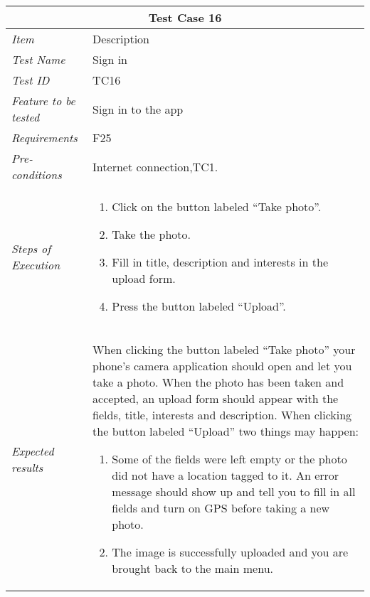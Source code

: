 \begin{minipage}{\linewidth}
\setlength{\tabcolsep}{15pt}
\centering
{}
\begin{tabular}{ |l|p{70mm}| }
	\hline
	\multicolumn{2}{|c|}{\cellcolor{gray!25} \textbf{Test Case 16}} \\
	\hline
	\it{\cellcolor{gray!25}Item} & {\cellcolor{gray!25} Description } \\
	\hline
	\it{\cellcolor{gray!25}Test Name } & Sign in \\ \hline
	\it{\cellcolor{gray!25}Test ID} & TC16 \\ \hline
	\it{\cellcolor{gray!25}Feature to be tested} & Sign in to the app \\ \hline
	\it{\cellcolor{gray!25}Requirements} & F25  \\ \hline
	\it{\cellcolor{gray!25}Pre-conditions} & Internet connection,TC1. \\ \hline
	\it{\cellcolor{gray!25}Steps of Execution} & \begin{enumerate}
	                                       \item Click on the button labeled “Take photo”.
	                                       \item Take the photo.
	                                       \item Fill in title, description and interests in the upload form.
	                                       \item Press the button labeled “Upload”.
	                                     \end{enumerate} \\ \hline
	\it{\cellcolor{gray!25}Expected results} & When clicking the button labeled “Take photo” your phone’s camera application should open and let you take a photo. When the photo has been taken and accepted, an upload form should appear with the fields, title, interests and description. When clicking the button labeled “Upload” two things may happen: \begin{enumerate}[label=\alph*)]
	                                       \item Some of the fields were left empty or the photo did not have a location tagged to it. An error message should show up and tell you to fill in all fields and turn on GPS before taking a new photo.
	                                       \item The image is successfully uploaded and you are brought back to the main menu.
	                                     \end{enumerate} \\
	\hline
\end{tabular}
\medskip
\end{minipage}
